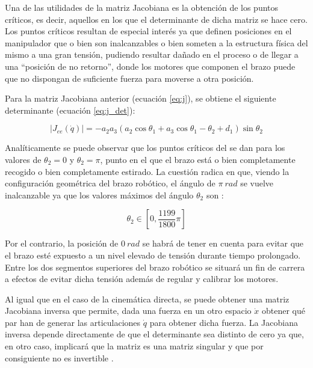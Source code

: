 Una de las utilidades de la matriz Jacobiana es la obtención de los puntos críticos,
es decir, aquellos en los que el determinante de dicha matriz se hace cero. Los puntos
críticos resultan de especial interés ya que definen posiciones en el manipulador que o
bien son inalcanzables o bien someten a la estructura física del mismo a una gran tensión,
pudiendo resultar dañado en el proceso o de llegar a una ``posición de no retorno'', donde
los motores que componen el brazo puede que no dispongan de suficiente fuerza para moverse a otra
posición.

Para la matriz Jacobiana anterior (ecuación \ref{eq:j}), se obtiene el siguiente 
determinante (ecuación \ref{eq:j_det}):

\begin{equation}\label{eq:j_det}
    \left|J_{ee}\left(\dot{q}\right)\right| = - a_{2} a_{3} \left(a_{2} \cos{\theta_{1}} + a_{3} \cos{\theta_{1} - \theta_{2}} + d_{1}\right) \sin{\theta_{2}}
\end{equation}

Analíticamente se puede observar que los puntos críticos del \pArm{} se dan para 
los valores de $\theta_2 = 0$ y $\theta_2 = \pi$, punto en el que el brazo está o bien
completamente recogido o bien completamente estirado. La cuestión radica en que, viendo
la configuración geométrica del brazo robótico, el ángulo de $\pi~rad$ se
vuelve inalcanzable ya que los valores máximos del ángulo $\theta_2$ son \cite{UArmDeveloperSwiftProForArduino}:

\begin{equation*}
    \theta_2 \in \left[0, \frac{1199}{1800}\pi\right]
\end{equation*}

Por el contrario, la posición de $0~rad$ se habrá de tener en cuenta para
evitar que el brazo esté expuesto a un nivel elevado de tensión durante tiempo prolongado.
Entre los dos segmentos superiores del brazo robótico se situará un fin de carrera a
efectos de evitar dicha tensión además de regular y calibrar los motores.

Al igual que en el caso de la cinemática directa, se puede obtener una matriz Jacobiana
inversa que permite, dada una fuerza en un otro espacio $\dot{x}$ obtener qué par han
de generar las articulaciones $\dot{q}$ para obtener dicha fuerza. La Jacobiana inversa
depende directamente de que el determinante sea distinto de cero ya que, en otro caso,
implicará que la matriz es una matriz singular y que por consiguiente no es invertible
\cite{InvertibleMatrix2020}.

